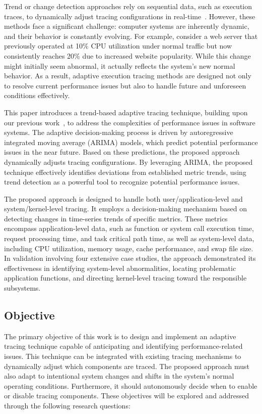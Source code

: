 \documentclass[pdflatex,sn-nature]{sn-jnl}%
\theoremstyle{thmstyleone}%
\theoremstyle{thmstyletwo}%
\theoremstyle{thmstylethree}%
\begin{document}
Trend or change detection approaches rely on sequential data, such as execution traces, to dynamically adjust tracing configurations in real-time~\cite{cantrill2004dynamic,ates2019automated}. However, these methods face a significant challenge: computer systems are inherently dynamic, and their behavior is constantly evolving. For example, consider a web server that previously operated at 10\% CPU utilization under normal traffic but now consistently reaches 20\% due to increased website popularity. While this change might initially seem abnormal, it actually reflects the system’s new normal behavior. As a result, adaptive execution tracing methods are designed not only to resolve current performance issues but also to handle future and unforeseen conditions effectively.

This paper introduces a trend-based adaptive tracing technique, building upon our previous work~\cite{10197790}, to address the complexities of performance issues in software systems. The adaptive decision-making process is driven by autoregressive integrated moving average (ARIMA) models, which predict potential performance issues in the near future. Based on these predictions, the proposed approach dynamically adjusts tracing configurations. By leveraging ARIMA, the proposed technique effectively identifies deviations from established metric trends, using trend detection as a powerful tool to recognize potential performance issues. 

The proposed approach is designed to handle both user/application-level and system/kernel-level tracing. It employs a decision-making mechanism based on detecting changes in time-series trends of specific metrics. These metrics encompass application-level data, such as function or system call execution time, request processing time, and task critical path time, as well as system-level data, including CPU utilization, memory usage, cache performance, and swap file size. In validation involving four extensive case studies, the approach demonstrated its effectiveness in identifying system-level abnormalities, locating problematic application functions, and directing kernel-level tracing toward the responsible subsystems.

\subsection{Objective}

The primary objective of this work is to design and implement an adaptive tracing technique capable of anticipating and identifying performance-related issues. This technique can be integrated with existing tracing mechanisms to dynamically adjust which components are traced. The proposed approach must also adapt to intentional system changes and shifts in the system's normal operating conditions. Furthermore, it should autonomously decide when to enable or disable tracing components. These objectives will be explored and addressed through the following research questions:
\end{document}
